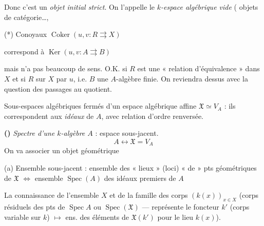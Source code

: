 \documentclass[11pt,a4paper]{article}
\begin{document}
Donc c'est un \emph{objet initial strict}. On l'appelle le \emph{$k$-espace algébrique vide} ( objets de catégorie…,

(*) Conoyaux $\operatorname{Coker}(u, v : R \rightrightarrows X)$

\quad correspond à \quad $\operatorname{Ker}(u, v : A \rightrightarrows B)$

\quad mais n'a pas beaucoup de sens. O.K. si $R$ est une « relation d'équivalence » dans $X$ et si $R$  sur $X$ par $u$, i.e. $B$ une $A$-algèbre finie. On reviendra dessus avec la question des passages au quotient.

Sous-espaces algébriques fermés d'un espace algébrique affine $\mathfrak{X} \simeq V_A$ : ils correspondent aux \emph{idéaux} de $A$, avec relation d'ordre renversée.

\textbf{()} \emph{Spectre d'une $k$-algèbre $A$} : espace sous-jacent.
\[
A \longleftrightarrow \mathfrak{X} = V_A
\]
On va associer un objet géométrique

(a) Ensemble sous-jacent : ensemble \struck{\ill{}} des « lieux » (loci) « de » pts géométriques de $\mathfrak{X}$ $\Longleftrightarrow$ ensemble \struck{\ill{}} $\operatorname{Spec}(A)$ des idéaux premiers de $A$

La connaissance de l'ensemble $X$ et de la famille des corps $(k(x))_{x \in X}$ (corps résiduels \struck{\ill{}} des pts de $\operatorname{Spec} A$ ou $\operatorname{Spec}(\mathfrak{X})$ ---  représente le foncteur $k'$ (corps variable sur $k$) $\longmapsto$ ens. des  éléments de $\mathfrak{X}(k')$  pour le lieu $k(x)$).
\end{document}
